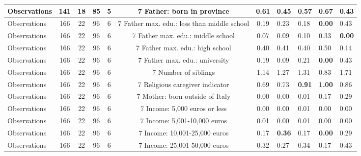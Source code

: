 \begin{tabular}{l c c c c c c }
\midrule
Observations &       141 &        18 &        85 &         5 &         7
Father: born in province &      0.61 &      0.45 &      0.57 &      0.67 &      0.43 \\
\midrule
Observations &       166 &        22 &        96 &         6 &         7
Father max. edu.: less than middle school &      0.19 &      0.23 &      0.18 & \textbf{     0.00} &      0.43 \\
\midrule
Observations &       166 &        22 &        96 &         6 &         7
Father max. edu.: middle school &      0.07 &      0.09 &      0.10 &      0.33 & \textbf{     0.00} \\
\midrule
Observations &       166 &        22 &        96 &         6 &         7
Father max. edu.: high school &      0.40 &      0.41 &      0.40 &      0.50 &      0.14 \\
\midrule
Observations &       166 &        22 &        96 &         6 &         7
Father max. edu.: university &      0.19 &      0.09 &      0.21 & \textbf{     0.00} &      0.43 \\
\midrule
Observations &       166 &        22 &        96 &         6 &         7
Number of siblings &      1.14 &      1.27 &      1.31 &      0.83 &      1.71 \\
\midrule
Observations &       166 &        22 &        96 &         6 &         7
Religious caregiver indicator &      0.69 &      0.73 & \textbf{     0.91} & \textbf{     1.00} &      0.86 \\
\midrule
Observations &       166 &        22 &        96 &         6 &         7
Mother: born outside of Italy &      0.00 &      0.00 &      0.01 &      0.17 &      0.29 \\
\midrule
Observations &       166 &        22 &        96 &         6 &         7
Income: 5,000 euros or less &      0.00 &      0.00 &      0.01 &      0.00 &      0.00 \\
\midrule
Observations &       166 &        22 &        96 &         6 &         7
Income: 5,001-10,000 euros &      0.01 &      0.00 &      0.01 &      0.00 &      0.00 \\
\midrule
Observations &       166 &        22 &        96 &         6 &         7
Income: 10,001-25,000 euros &      0.17 & \textbf{     0.36} &      0.17 & \textbf{     0.00} &      0.29 \\
\midrule
Observations &       166 &        22 &        96 &         6 &         7
Income: 25,001-50,000 euros &      0.32 &      0.27 &      0.34 &      0.17 &      0.43 \\

\end{tabular}
